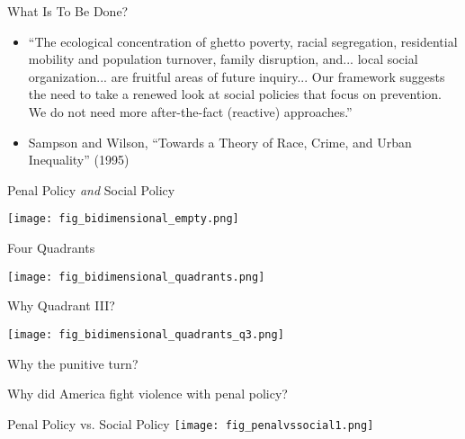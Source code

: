 \documentclass{beamer}
\begin{document}
\begin{frame}{What Is To Be Done?}
\begin{itemize}
\item[] ``The ecological concentration of ghetto poverty, racial segregation, residential mobility and population turnover, family disruption, and... local social organization... are fruitful areas of future inquiry... \alert{Our framework suggests the need to take a renewed look at social policies that focus on prevention.} We do not need more after-the-fact (reactive) approaches.''
\item[] Sampson and Wilson, ``Towards a Theory of Race, Crime, and Urban Inequality'' (1995)
\end{itemize}
\end{frame}

\begin{frame}{Penal Policy \textit{and} Social Policy}
\begin{center}
    \texttt{[image: fig\_bidimensional\_empty.png]}
\end{center}
\end{frame}

\begin{frame}{Four Quadrants}
\begin{center}
    \texttt{[image: fig\_bidimensional\_quadrants.png]}
\end{center}
\end{frame}

\begin{frame}{Why Quadrant III?}
\begin{center}
    \texttt{[image: fig\_bidimensional\_quadrants\_q3.png]}
\end{center}
\end{frame}

\begin{frame}{}
\begin{center}
    {\Large Why the punitive turn?}
\end{center}
\end{frame}

\begin{frame}{}
\begin{center}
    {\Large \alert{Why did America fight violence with penal policy?}}
\end{center}
\end{frame}

\begin{frame}{Penal Policy vs. Social Policy}
    \texttt{[image: fig\_penalvssocial1.png]}
\end{frame}
\end{document}
